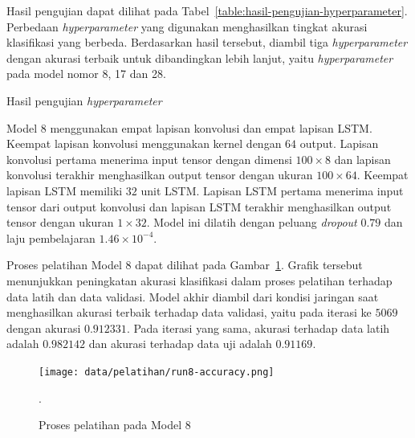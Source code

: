 Hasil pengujian dapat dilihat pada Tabel~\ref{table:hasil-pengujian-hyperparameter}. Perbedaan \textit{hyperparameter} yang digunakan menghasilkan tingkat akurasi klasifikasi yang berbeda. Berdasarkan hasil tersebut, diambil tiga \textit{hyperparameter} dengan akurasi terbaik untuk dibandingkan lebih lanjut, yaitu \textit{hyperparameter} pada model nomor 8, 17 dan 28.

\begin{table}[h!]
    \centering
    \caption{Hasil pengujian \textit{hyperparameter}}
    \label{table:hasil-pengujian-hyperparameter}
\end{table}

Model 8 menggunakan empat lapisan konvolusi dan empat lapisan LSTM\@. Keempat lapisan konvolusi menggunakan kernel dengan $64$ output. Lapisan konvolusi pertama menerima input tensor dengan dimensi $100 \times 8$ dan lapisan konvolusi terakhir menghasilkan output tensor dengan ukuran $100 \times 64$. Keempat lapisan LSTM memiliki $32$ unit LSTM\@. Lapisan LSTM pertama menerima input tensor dari output konvolusi dan lapisan LSTM terakhir menghasilkan output tensor dengan ukuran $1 \times 32$. Model ini dilatih dengan peluang \textit{dropout} $0.79$ dan laju pembelajaran $1.46 \times 10^{-4}$.

Proses pelatihan Model 8 dapat dilihat pada Gambar~\ref{gambar:run8-training}. Grafik tersebut menunjukkan peningkatan akurasi klasifikasi dalam proses pelatihan terhadap data latih dan data validasi. Model akhir diambil dari kondisi jaringan saat menghasilkan akurasi terbaik terhadap data validasi, yaitu pada iterasi ke $5069$ dengan akurasi $0.912331$. Pada iterasi yang sama, akurasi terhadap data latih adalah $0.982142$ dan akurasi terhadap data uji adalah $0.91169$.

\begin{figure}[h!]
    \centering
    \texttt{[image: data/pelatihan/run8-accuracy.png]}
    \caption{Proses pelatihan pada Model 8}.
    \label{gambar:run8-training}
\end{figure}

